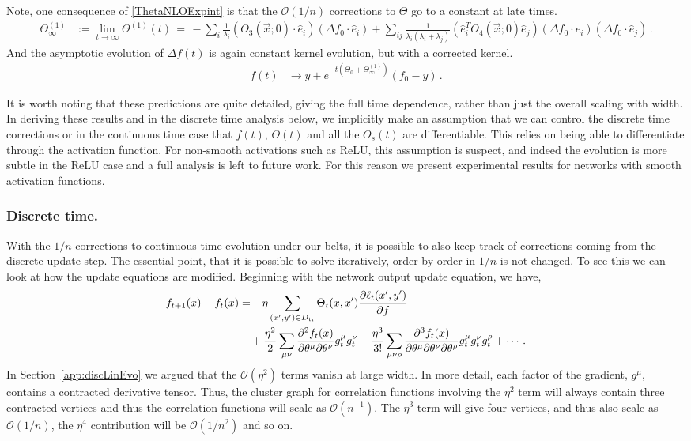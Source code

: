 \documentclass[english]{article}
\newcommand{\cO}{\ensuremath{\mathcal{O}}}
\newcommand{\es}[2] {\begin{align} \label{#1} #2 \end{align}}
\begin{document}
Note, one consequence of \eqref{ThetaNLOExpint} is that the $\mathcal{O}(1/n)$ corrections to $\Theta$ go to a constant at late times.
\es{ThetaLateTimes}{
  \Theta^{(1)}_\infty
  &:=
  \lim_{t\rightarrow\infty}\Theta^{(1)}(t)
  \,=\, -\sum_{i}\frac{1}{\lambda_{i}}(O_{3}(\vec{x};0)\cdot\hat{e}_{i})(\Delta f_{0}\cdot\hat{e}_{i})
+\sum_{ij}\frac{1}{\lambda_{i}(\lambda_{i}+\lambda_{j})}(\hat{e}_{i}^{T}O_{4}(\vec{x};0)\hat{e}_{j})(\Delta f_{0}\cdot \hat{e}_{i})(\Delta f_{0}\cdot \hat{e}_{j})\,.
}
And the asymptotic evolution of $\Delta f(t)$ is again constant kernel evolution, but with a corrected kernel.
\es{asymp_f}{
f(t)&\rightarrow y+e^{-t(\Theta_{0}+\Theta_{\infty}^{(1)})}\left(f_{0}-y\right)\,.
}


It is worth noting that these predictions are quite detailed, giving the full time dependence, rather than just the overall scaling with width. In deriving these results and in the discrete time analysis below, we implicitly make an assumption that we can control the discrete time corrections or in the continuous time case that $f(t)$, $\Theta(t)$ and all the $O_s(t)$ are differentiable. This relies on being able to differentiate through the activation function. For non-smooth activations such as ReLU, this assumption is suspect, and indeed the evolution is more subtle in the ReLU case and a full analysis is left to future work. For this reason we present experimental results for networks with smooth activation functions. 

\subsubsection{Discrete time.}
With the $1/n$ corrections to continuous time evolution under our belts, it is possible to also keep track of corrections coming from the discrete update step.
The essential point, that it is possible to solve iteratively, order by order in $1/n$ is  not changed.
To see this we can look at how the update equations are modified.
Beginning with the network output update equation, we have,
\begin{align}
f_{t+1}(x)-f_{t}(x) &=-\eta\sum_{(x',y')\in D_{\rm tr}} \Theta_{t}(x,x') \frac{\partial\ell_{t}(x',y')}{\partial f}\nonumber\\
&\quad +\frac{\eta^{2}}{2}\sum_{\mu\nu}\frac{\partial^{2}f_{t}(x)}{\partial\theta^{\mu}\partial\theta^{\nu}}g^{\mu}_{t}g^{\nu}_{t}-\frac{\eta^{3}}{3!}\sum_{\mu\nu\rho}\frac{\partial^{3}f_{t}(x)}{\partial\theta^{\mu}\partial\theta^{\nu}\partial\theta^{\rho}}g^{\mu}_{t}g^{\nu}_{t}g^{\rho}_{t}+\cdots\,.\label{disc_logit_update}
\end{align}
In Section~\ref{app:discLinEvo} we argued that the $\cO(\eta^2)$ terms vanish at large width.
In more detail, each factor of the gradient, $g^{\mu}$, contains a contracted derivative tensor. Thus, the cluster graph for correlation functions involving the $\eta^{2}$ term will always contain three contracted vertices and thus the correlation functions will scale as $\mathcal{O}(n^{-1})$. The $\eta^{3}$ term will give four vertices, and thus also scale as $\mathcal{O}(1/n)$, the $\eta^{4}$ contribution will be $\mathcal{O}(1/n^{2})$ and so on.
\end{document}
